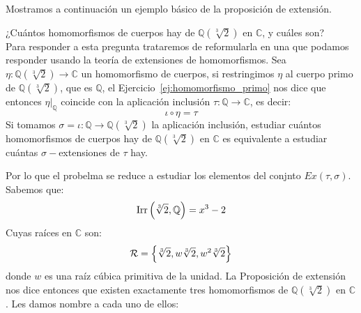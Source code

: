 \noindent
Mostramos a continuación un ejemplo básico de la proposición de extensión.

\begin{ejemplo}
    ¿Cuántos homomorfismos de cuerpos hay de $\mathbb{Q}\left(\sqrt[3]{2}\right)$ en $\mathbb{C}$, y cuáles son?\\

    \noindent
    Para responder a esta pregunta trataremos de reformularla en una que podamos responder usando la teoría de extensiones de homomorfismos. Sea $\eta:\mathbb{Q}\left(\sqrt[3]{2}\right)\to\mathbb{C}$ un homomorfismo de cuerpos, si restringimos $\eta$ al cuerpo primo de $\mathbb{Q}\left(\sqrt[3]{2}\right)$, que es $\mathbb{Q}$, el Ejercicio~\ref{ej:homomorfismo_primo} nos dice que entonces $\eta\big|_{\mathbb{Q}}$ coincide con la aplicación inclusión $\tau:\mathbb{Q}\to \mathbb{C}$, es decir:
    \begin{equation*}
        \iota \circ \eta = \tau
    \end{equation*}
    Si tomamos $\sigma=\iota:\mathbb{Q}\to\mathbb{Q}\left(\sqrt[3]{2}\right)$ la aplicación inclusión, estudiar cuántos homomorfismos de cuerpos hay de $\mathbb{Q}\left(\sqrt[3]{2}\right)$ en $\mathbb{C}$ es equivalente a estudiar cuántas $\sigma-$extensiones de $\tau$ hay.
    \begin{figure}[H]
        \centering
    \end{figure}
    \noindent
    Por lo que el probelma se reduce a estudiar los elementos del conjnto $Ex(\tau,\sigma)$. Sabemos que:
    \begin{equation*}
        \operatorname{Irr}\left(\sqrt[3]{2},\mathbb{Q}\right) = x^3-2
    \end{equation*}
    Cuyas raíces en $\mathbb{C}$ son:
    \begin{equation*}
        \mathcal{R} = \left\{\sqrt[3]{2}, w\sqrt[3]{2}, w^2\sqrt[3]{2}\right\}
    \end{equation*}
    donde $w$ es una raíz cúbica primitiva de la unidad. La Proposición de extensión nos dice entonces que existen exactamente tres homomorfismos de $\mathbb{Q}\left(\sqrt[3]{2}\right)$ en $\mathbb{C}$. Les damos nombre a cada uno de ellos:

\end{ejemplo}
